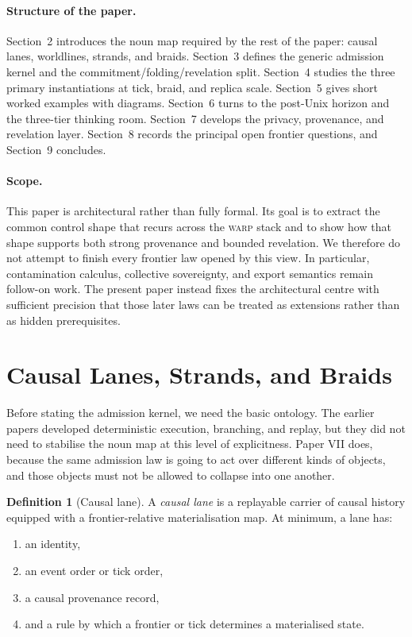 \documentclass[11pt]{article}
\theoremstyle{definition}
\newtheorem{definition}{Definition}[section]
\theoremstyle{plain}
\theoremstyle{remark}
\newcommand{\WARP}{\textsc{warp}}
\begin{document}
\paragraph{Structure of the paper.}
Section~2 introduces the noun map required by the rest of the paper: causal lanes, worldlines, strands, and braids. Section~3 defines the generic admission kernel and the commitment/folding/revelation split. Section~4 studies the three primary instantiations at tick, braid, and replica scale. Section~5 gives short worked examples with diagrams. Section~6 turns to the post-Unix horizon and the three-tier thinking room. Section~7 develops the privacy, provenance, and revelation layer. Section~8 records the principal open frontier questions, and Section~9 concludes.

\paragraph{Scope.}
This paper is architectural rather than fully formal. Its goal is to extract the common control shape that recurs across the \WARP{} stack and to show how that shape supports both strong provenance and bounded revelation. We therefore do not attempt to finish every frontier law opened by this view. In particular, contamination calculus, collective sovereignty, and export semantics remain follow-on work. The present paper instead fixes the architectural centre with sufficient precision that those later laws can be treated as extensions rather than as hidden prerequisites.

\clearpage

\section{Causal Lanes, Strands, and Braids}

Before stating the admission kernel, we need the basic ontology. The earlier papers developed deterministic execution, branching, and replay, but they did not need to stabilise the noun map at this level of explicitness. Paper VII does, because the same admission law is going to act over different kinds of objects, and those objects must not be allowed to collapse into one another.

\begin{definition}[Causal lane]
A \emph{causal lane} is a replayable carrier of causal history equipped with a frontier-relative materialisation map. At minimum, a lane has:
\begin{enumerate}[leftmargin=*]
  \item an identity,
  \item an event order or tick order,
  \item a causal provenance record,
  \item and a rule by which a frontier or tick determines a materialised state.
\end{enumerate}
\end{definition}
\end{document}
